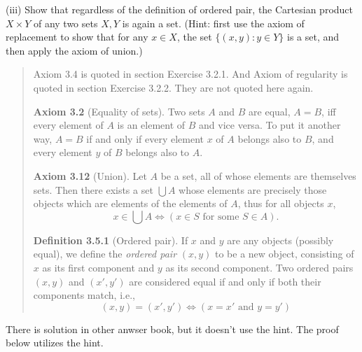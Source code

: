 \documentclass{article}
\begin{document}
(iii) Show that regardless of the definition of ordered pair,
the Cartesian product $X \times Y$ of any two sets $X, Y$ is again a set.
(Hint: first use the axiom of replacement to show that for any $x \in X$,
the set $\{(x, y) : y \in Y\}$ is a set, and then apply the axiom of union.)

\begin{quotation}
    Axiom 3.4 is quoted in section Exercise 3.2.1.
    And Axiom of regularity is quoted in section Exercise 3.2.2.
    They are not quoted here again.

    \textbf{Axiom 3.2} (Equality of sets).
    Two sets $A$ and $B$ are equal, $A = B$,
    iff every element of $A$ is an element of $B$ and vice versa.
    To put it another way, $A = B$ if and only if every element $x$ of $A$ belongs also to $B$,
    and every element $y$ of $B$ belongs also to $A$.

    \textbf{Axiom 3.12} (Union). Let $A$ be a set, all of whose elements are themselves sets.
    Then there exists a set $\bigcup A$
    whose elements are precisely those objects which are elements of the elements of $A$,
    thus for all objects $x$,
    \[
        x \in\bigcup A \iff (x \in S \text{ for some } S \in A).
    \]

    \textbf{Definition 3.5.1} (Ordered pair). If $x$ and $y$ are any objects (possibly equal),
    we define the \textit{ordered pair} $(x, y)$ to be a new object,
    consisting of $x$ as its first component and $y$ as its second component.
    Two ordered pairs $(x, y)$ and $(x', y')$ are considered equal
    if and only if both their components match, i.e.,
    \[
        (x, y) = (x', y') \iff (x = x' \text{ and } y = y')\tag*{(3.5)}
    \]
\end{quotation}

There is solution in other anwser book, but it doesn't use the hint.
The proof below utilizes the hint.
\end{document}
